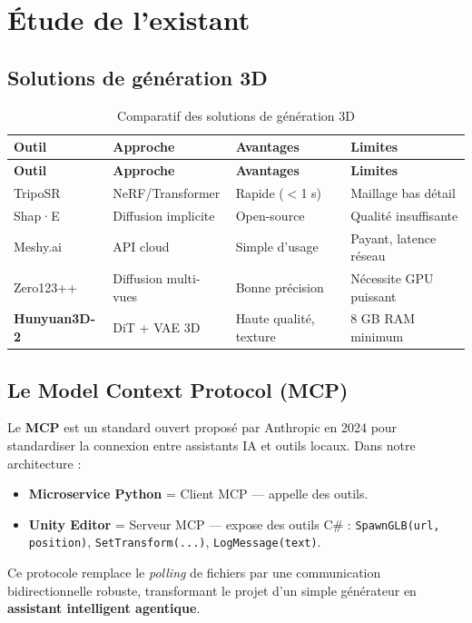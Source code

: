 \documentclass[12pt,a4paper,oneside]{report}
\begin{document}
\section{Étude de l'existant}

\subsection{Solutions de génération 3D}
\begin{longtable}{@{}p{2.8cm}p{3.6cm}p{3.5cm}p{4.2cm}@{}}
\caption{Comparatif des solutions de génération 3D}\label{tab:existant}\\
\toprule
\textbf{Outil} & \textbf{Approche} & \textbf{Avantages} & \textbf{Limites} \\
\midrule\endfirsthead
\toprule\textbf{Outil} & \textbf{Approche} & \textbf{Avantages} & \textbf{Limites} \\
\midrule\endhead
TripoSR      & NeRF/Transformer   & Rapide ($<$1 s)      & Maillage bas détail \\
Shap·E       & Diffusion implicite & Open-source         & Qualité insuffisante \\
Meshy.ai     & API cloud          & Simple d'usage       & Payant, latence réseau \\
Zero123++    & Diffusion multi-vues& Bonne précision     & Nécessite GPU puissant \\
\textbf{Hunyuan3D-2} & DiT + VAE 3D & Haute qualité, texture & 8 GB RAM minimum \\
\bottomrule
\end{longtable}

\subsection{Le Model Context Protocol (MCP)}
Le \textbf{MCP} est un standard ouvert proposé par Anthropic en 2024 pour
standardiser la connexion entre assistants IA et outils locaux. Dans notre
architecture :
\begin{itemize}
  \item \textbf{Microservice Python} = Client MCP — appelle des outils.
  \item \textbf{Unity Editor} = Serveur MCP — expose des outils C\# :
        \texttt{SpawnGLB(url, position)}, \texttt{SetTransform(...)},
        \texttt{LogMessage(text)}.
\end{itemize}
Ce protocole remplace le \textit{polling} de fichiers par une communication
bidirectionnelle robuste, transformant le projet d'un simple générateur en
\textbf{assistant intelligent agentique}.
\end{document}

